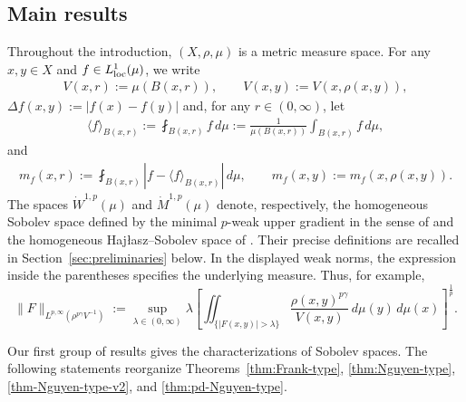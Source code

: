 \documentclass[11pt]{amsart}
\theoremstyle{definition}
\theoremstyle{remark}
\numberwithin{equation}{section}
\begin{document}
\subsection{Main results}

Throughout the introduction, $(X,\rho,\mu)$ is a metric measure space.
For any $x,y\in X$ and $f\in L^1_{\rm loc}(\mu)$, we
write
\begin{align*}
 V(x,r):=\mu(B(x,r)),\qquad
 V(x,y):=V(x,\rho(x,y)),
\end{align*}
$\Delta f(x,y):=|f(x)-f(y)|$ and, for any $r\in(0,\infty)$, let
\begin{align*}
\langle f\rangle_{B(x,r)}:=\fint_{B(x,r)}f\,d\mu:=\frac{1}{\mu(B(x,r))}\int_{B(x,r)}
 f\,d\mu,
\end{align*}
and
\begin{align}\label{eq-def:mf}
 m_f(x,r):=\fint_{B(x,r)}|f-\langle f\rangle_{B(x,r)}|\,d\mu,
 \qquad m_f(x,y):=m_f(x,\rho(x,y)).
\end{align}
The spaces $\dot W^{1,p}(\mu)$ and $\dot M^{1,p}(\mu)$ denote, respectively,
the homogeneous Sobolev space defined by the minimal $p$-weak upper gradient in the sense of
\cite{AGS:13} and the
homogeneous Haj\l{}asz--Sobolev space of \cite{Haj:96}.  Their precise definitions are
recalled
in Section~\ref{sec:preliminaries} below.  In the displayed weak norms, the
expression inside the parentheses specifies the underlying measure.  Thus,
for example,
\begin{equation*}
 \|F\|_{L^{p,\infty}(\rho^{p\gamma}V^{-1})}
 :=\sup_{\lambda\in(0,\infty)}\lambda
 \left[\iint_{\{|F(x,y)|>\lambda\}}
 \frac{\rho(x,y)^{p\gamma}}{V(x,y)}\,d\mu(y)\,d\mu(x)\right]^{\frac1p}.
\end{equation*}

Our first group of results gives the characterizations of Sobolev spaces.  The
following statements reorganize Theorems~\ref{thm:Frank-type},
\ref{thm:Nguyen-type}, \ref{thm-Nguyen-type-v2}, and \ref{thm:pd-Nguyen-type}.
\end{document}
